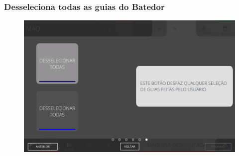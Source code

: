 \newpage
\thispagestyle{fancy}
\vspace*{40 pt}
\subsubsection{\small{Desseleciona todas as guias do Batedor}} \label{sec:comandosBatedorDesselecionaTodasAsGuiasDoBatedor}
\vspace*{\fill}
\begin{figure}[h]
    \centering
    \includegraphics[width=576 px,height=360 px]{src/imagesICV/07-scout/commands/6.png}
\end{figure}
\vspace*{\fill}
